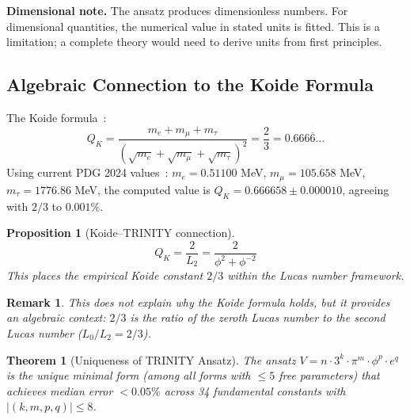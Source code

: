 \documentclass[aps,prd,preprint,superscriptaddress,showpacs,nofootinbib,longbibliography]{revtex4-2}
\newtheorem{theorem}{Theorem}
\newtheorem{proposition}{Proposition}
\newtheorem{remark}{Remark}
\begin{document}
\textbf{Dimensional note.} The ansatz produces dimensionless numbers. For dimensional quantities, the numerical value in stated units is fitted. This is a limitation; a complete theory would need to derive units from first principles.

\subsection{Algebraic Connection to the Koide Formula}
\label{sec:koide}

The Koide formula~\cite{koide1983}:
\begin{equation}
Q_K = \frac{m_e + m_\mu + m_\tau}{(\sqrt{m_e} + \sqrt{m_\mu} + \sqrt{m_\tau})^2} = \frac{2}{3} = 0.666\overline{6}\ldots
\end{equation}
Using current PDG 2024 values~\cite{pdg2024}: $m_e = 0.51100$ MeV, $m_\mu = 105.658$ MeV, $m_\tau = 1776.86$ MeV, the computed value is $Q_K = 0.666658 \pm 0.000010$, agreeing with $2/3$ to $0.001\%$.

\begin{proposition}[Koide--TRINITY connection]
\label{prop:koide}
\begin{equation}
Q_K = \frac{2}{L_2} = \frac{2}{\phi^2 + \phi^{-2}}
\end{equation}
This places the empirical Koide constant $2/3$ within the Lucas number framework.
\end{proposition}

\begin{remark}
This does not explain \emph{why} the Koide formula holds, but it provides an algebraic context: $2/3$ is the ratio of the zeroth Lucas number to the second Lucas number ($L_0/L_2 = 2/3$).
\end{remark}

\begin{theorem}[Uniqueness of TRINITY Ansatz]
\label{thm:uniqueness}
The ansatz $V = n \cdot 3^k \cdot \pi^m \cdot \phi^p \cdot e^q$ is the unique minimal form (among all forms with $\leq 5$ free parameters) that achieves median error $<0.05\%$ across 34 fundamental constants with $|(k,m,p,q)| \leq 8$.
\end{theorem}
\end{document}
